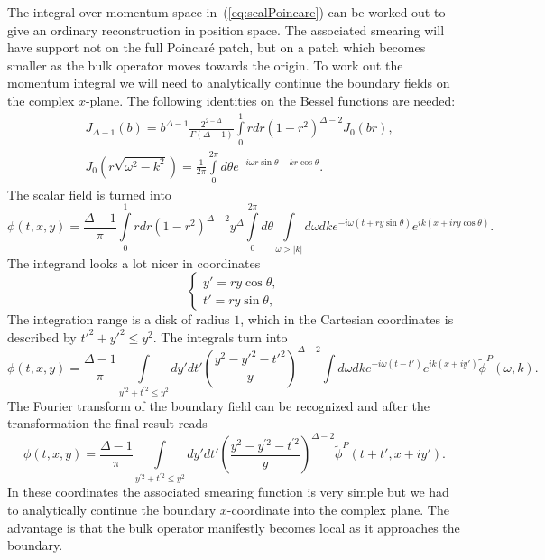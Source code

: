 \documentclass{PoS}
\newcommand{\LF}{\left(}
\newcommand{\RF}{\right)}
\begin{document}
\begin{appendix}
\begin{equation}
\end{equation}
The integral over momentum space in~(\ref{eq:scalPoincare}) can be worked out to give an ordinary reconstruction in position space. The associated smearing will have support not on the full Poincar\'e patch, but on a patch which becomes smaller as the bulk operator moves towards the origin. To work out the momentum integral we will need to analytically continue the boundary fields on the complex $x$-plane. The following identities on the Bessel functions are needed:
\begin{align}
&J_{\Delta-1}(b) = b^{\Delta-1} \frac{2^{2-\Delta}}{\Gamma \LF \Delta-1\RF} \int\limits_0^1 r dr \LF 1-r^2\RF^{\Delta-2} J_0(br),\\
&J_0\LF r\sqrt{\omega^2-k^2}\RF = \frac{1}{2\pi} \int\limits_0^{2\pi} d\theta e^{-i\omega r \sin\theta - kr\cos\theta}.
\end{align}  
The scalar field is turned into
\begin{equation}
\phi(t,x,y) = \frac{\Delta-1}{\pi}\int\limits_0^1 r dr (1-r^2)^{\Delta-2} y^{\Delta}\int\limits_0^{2\pi} d\theta \int\limits_{\omega > \left|k \right|} d\omega dk e^{-i\omega (t+ry\sin\theta)} e^{ik\LF x+iry\cos\theta\RF}.
\end{equation}
The integrand looks a lot nicer in coordinates
\begin{equation}
\left\{
\begin{matrix}
y' = ry\cos\theta,\\
t' = ry\sin\theta,
\end{matrix}
\right.
\end{equation}
The integration range is a disk of radius $1$, which in the Cartesian coordinates is described by $t'^2+y'^2 \leq y^2$. The integrals turn into
\begin{equation}
\phi(t,x,y)= \frac{\Delta-1}{\pi} \int\limits_{ y^{'2} + t^{'2}\leq y^2} dy' dt' \LF \frac{y^2-y'^2 -t'^2}{y}\RF^{\Delta- 2} \int\limits d\omega dk e^{-i\omega (t-t')} e^{ik (x+iy')} \tilde{\phi}^P(\omega,k).
\end{equation}
The Fourier transform of the boundary field can be recognized and after the transformation the final result reads
\begin{equation}
\phi(t,x,y) = \frac{\Delta-1}{\pi} \int\limits_{ y^{'2} + t^{'2} \leq y^2} dy' dt' \LF \frac{ y^2-y^{'2}-t^{'2}}{y}\RF^{\Delta-2} \tilde{\phi}^P (t+t',x+iy').
\end{equation}
In these coordinates the associated smearing function is very simple but we had to analytically continue the boundary $x$-coordinate into the complex plane. The advantage is that the bulk operator manifestly becomes local as it approaches the boundary. 


\end{appendix}






\end{document}
